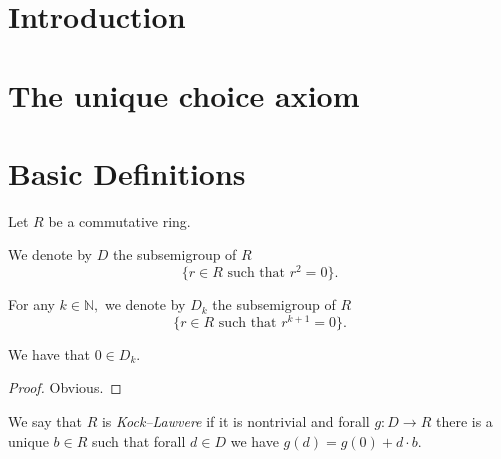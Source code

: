 %

\section*{Introduction}

\section{The unique choice axiom}

\section{Basic Definitions}
Let $R$ be a commutative ring.

\begin{definition}
  \label{SDG.D}
  \leanok
We denote by $D$ the subsemigroup of $R$
\[
\{r \in R \mbox{ such that } r ^ 2 = 0 \}.
\]
\end{definition}

\begin{definition}
  \label{SDG.Dk}
  \leanok
For any $k\in \mathbb{N},$ we denote by $D_k$ the subsemigroup of $R$
\[
\{r \in R \mbox{ such that } r ^ {k+1} = 0 \}.
\]
\end{definition}

\begin{lemma}
  \label{SDG.zero_mem_Dk}
  \leanok
  We have that $0 \in D_k.$
\end{lemma}
\begin{proof}
  \leanok
  Obvious.
\end{proof}

\begin{definition}
  \label{SDG.IsKockLawvereone}
  \leanok
We say that $R$ is \emph{Kock--Lawvere} if it is nontrivial and forall $g : D → R$ there is a unique
$b \in R$ such that forall $d \in D$ we have $g(d) = g(0) + d \cdot b$.
\end{definition}

